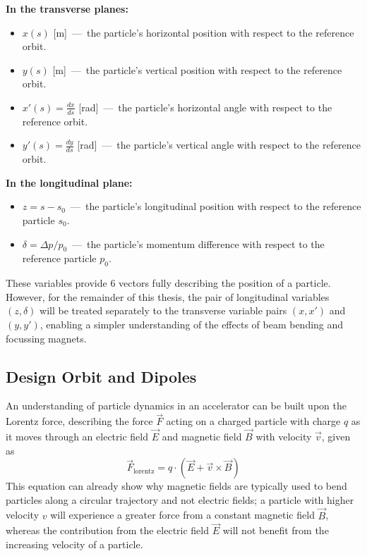 \documentclass[a4paper,twoside,11pt]{report}
\begin{document}
\noindent \textbf{In the transverse planes:}
\begin{itemize}
  \item $x(s)$ [m]~---~the particle's horizontal position with respect to the reference orbit.
  \item $y(s)$ [m]~---~the particle's vertical position with respect to the reference orbit.
  \item $x'(s)=\frac{dx}{ds}$ [rad]~---~the particle's horizontal angle with respect to the reference orbit.
  \item $y'(s)=\frac{dy}{ds}$ [rad]~---~the particle's vertical angle with respect to the reference orbit.
\end{itemize}
\textbf{In the longitudinal plane:}
\begin{itemize}
    \item $z=s-s_0$~---~the particle's longitudinal position with respect to the reference particle $s_0$.
    \item $\delta = \Delta p/p_0$~---~the particle's momentum difference with respect to the reference particle $p_0$.
\end{itemize} 

These variables provide 6 vectors fully describing the position of a particle. However, for the remainder of this thesis, the pair of longitudinal variables $(z, \delta)$ will be treated separately to the transverse variable pairs $(x, x')$ and $(y, y')$, enabling a simpler understanding of the effects of beam bending and focussing magnets.

\subsection{Design Orbit and Dipoles}

An understanding of particle dynamics in an accelerator can be built upon the Lorentz force, describing the force $\vec F$ acting on a charged particle with charge $q$ as it moves through an electric field $\vec E$ and magnetic field $\vec B$ with velocity $\vec v$, given as
\begin{equation}
\vec F_{\text{lorentz}} = q\cdot(\vec E+ \vec v\times\vec B)\label{eq:lorentz}
\end{equation}
This equation can already show why magnetic fields are typically used to bend particles along a circular trajectory and not electric fields; a particle with higher velocity $v$ will experience a greater force from a constant magnetic field $\vec B$, whereas the contribution from the electric field $\vec E$ will not benefit from the increasing velocity of a particle.
\end{document}
